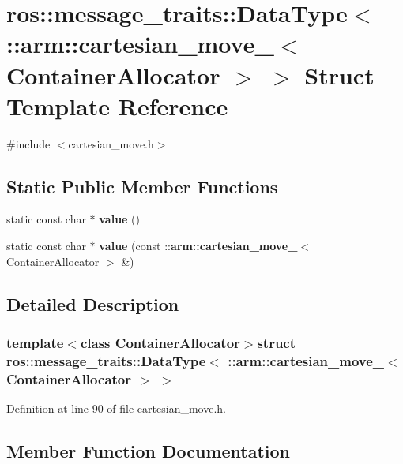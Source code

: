 \section{ros\-:\-:message\-\_\-traits\-:\-:\-Data\-Type$<$ \-:\-:arm\-:\-:cartesian\-\_\-move\-\_\-$<$ \-Container\-Allocator $>$ $>$ \-Struct \-Template \-Reference}
\label{structros_1_1message__traits_1_1DataType_3_01_1_1arm_1_1cartesian__move___3_01ContainerAllocator_01_4_01_4}


{\ttfamily \#include $<$cartesian\-\_\-move.\-h$>$}

\subsection*{\-Static \-Public \-Member \-Functions}
\begin{DoxyCompactItemize}
\item 
static const char $\ast$ {\bf value} ()
\item 
static const char $\ast$ {\bf value} (const \-::{\bf arm\-::cartesian\-\_\-move\-\_\-}$<$ \-Container\-Allocator $>$ \&)
\end{DoxyCompactItemize}


\subsection{\-Detailed \-Description}
\subsubsection*{template$<$class Container\-Allocator$>$struct ros\-::message\-\_\-traits\-::\-Data\-Type$<$ \-::arm\-::cartesian\-\_\-move\-\_\-$<$ Container\-Allocator $>$ $>$}



\-Definition at line 90 of file cartesian\-\_\-move.\-h.



\subsection{\-Member \-Function \-Documentation}
